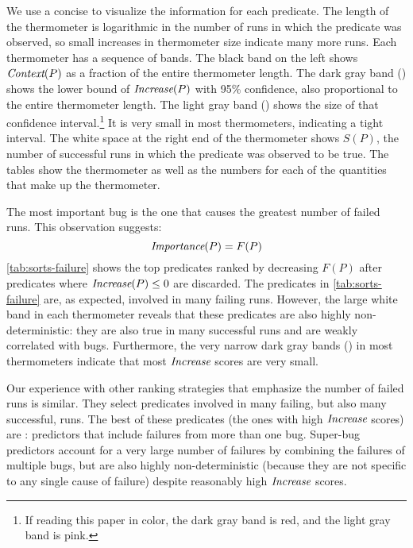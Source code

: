 We use a concise  to visualize the
information for each predicate.  The length of the thermometer is
logarithmic in the number of runs in which the predicate was observed,
so small increases in thermometer size indicate many more runs.  Each
thermometer has a sequence of bands.  The black band on the left shows
$\textit{Context}(P)$ as a fraction of the entire thermometer length.  The
dark gray band () shows the lower bound of $\textit{Increase}(P)$
with 95\% confidence, also proportional to the entire thermometer
length.  The light gray band () shows the size of that
confidence interval.\footnote{If reading this paper in color, the dark
gray band is red, and the light gray band is pink.}  It is very small
in most thermometers, indicating a tight interval.  The white space at
the right end of the thermometer shows $S(P)$, the number of
successful runs in which the predicate was observed to be true.  The
tables show the thermometer as well as the numbers for each of the
quantities that make up the thermometer.

The most important bug is the one that causes the greatest number of
failed runs.  This observation suggests:
\[ \textit{Importance}(P) = F(P) \]
\autoref{tab:sorts-failure} shows the top predicates ranked by
decreasing $F(P)$ after predicates where $\textit{Increase}(P) \leq 0$ are
discarded.  The predicates in \autoref{tab:sorts-failure} are, as
expected, involved in many failing runs.  However, the large white
band in each thermometer reveals that these predicates are also highly
non-deterministic: they are also true in many successful runs and are
weakly correlated with bugs.  Furthermore, the very narrow dark gray
bands () in most thermometers indicate that most
$\textit{Increase}$ scores are very small.

Our experience with other ranking strategies that emphasize the number
of failed runs is similar.  They select predicates involved in many
failing, but also many successful, runs.  The best of these predicates
(the ones with high $\textit{Increase}$ scores) are : predictors that include failures from more than one
bug.  Super-bug predictors account for a
very large number of failures by combining the failures of multiple
bugs, but are also highly non-deterministic (because they are not 
specific to any single cause of failure) despite reasonably high
$\textit{Increase}$ scores.

